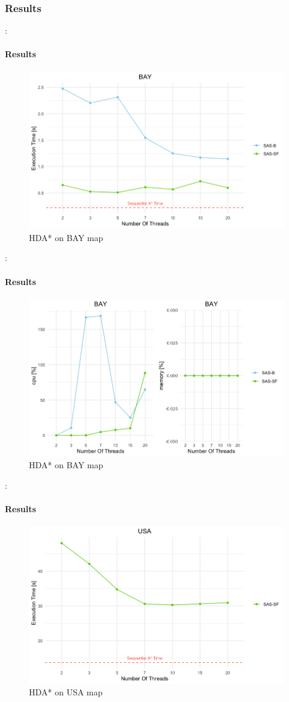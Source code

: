 \documentclass[12pt]{beamer}
\begin{document}
	\subsubsection{Results}
	\begin{frame}{\secname : \subsecname}
		\framesubtitle{Results}
		\begin{figure}[ht!]
			\centering
			\includegraphics[width=0.8\linewidth]{hda/baytime.png}
			\caption{HDA* on BAY map}
		\end{figure}
	\end{frame}
	\begin{frame}{\secname : \subsecname}
		\framesubtitle{Results}
		\begin{figure}[ht!]
			\centering
			\includegraphics[width=0.8\linewidth]{hda/baycpumem.png}
			\caption{HDA* on BAY map}
		\end{figure}
	\end{frame}
	\begin{frame}{\secname : \subsecname}
		\framesubtitle{Results}
		\begin{figure}[ht!]
			\centering
			\includegraphics[width=0.8\linewidth]{hda/usatime.png}
			\caption{HDA* on USA map}
		\end{figure}
	\end{frame}
\end{document}
